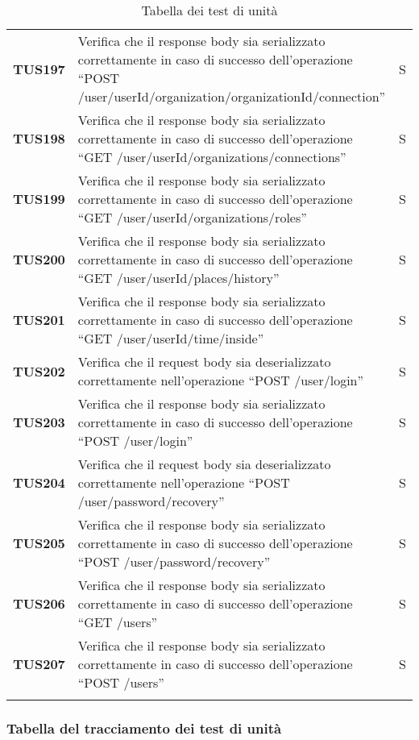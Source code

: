 \documentclass[../../piano-di-qualifica.tex]{subfiles}
\begin{document}
\begin{longtable}[H]{>{\centering\bfseries}m{3cm} >{}m{10cm} >{\centering\arraybackslash}m{3cm}}
  TUS197 & Verifica che il response body sia serializzato correttamente in caso di successo dell'operazione ``POST /user/{userId}/organization/{organizationId}/connection'' & S \\
  TUS198 & Verifica che il response body sia serializzato correttamente in caso di successo dell'operazione ``GET /user/{userId}/organizations/connections'' & S \\
  TUS199 & Verifica che il response body sia serializzato correttamente in caso di successo dell'operazione ``GET /user/{userId}/organizations/roles'' & S \\
  TUS200 & Verifica che il response body sia serializzato correttamente in caso di successo dell'operazione ``GET /user/{userId}/places/history'' & S \\
  TUS201 & Verifica che il response body sia serializzato correttamente in caso di successo dell'operazione ``GET /user/{userId}/time/inside'' & S \\
  TUS202 & Verifica che il request body sia deserializzato correttamente nell'operazione ``POST /user/login'' & S \\
  TUS203 & Verifica che il response body sia serializzato correttamente in caso di successo dell'operazione ``POST /user/login'' & S \\
  TUS204 & Verifica che il request body sia deserializzato correttamente nell'operazione ``POST /user/password/recovery'' & S \\
  TUS205 & Verifica che il response body sia serializzato correttamente in caso di successo dell'operazione ``POST /user/password/recovery'' & S \\
  TUS206 & Verifica che il response body sia serializzato correttamente in caso di successo dell'operazione ``GET /users'' & S \\
  TUS207 & Verifica che il response body sia serializzato correttamente in caso di successo dell'operazione ``POST /users'' & S \\
  \rowcolor{white}
  \caption{Tabella dei test di unità}%
  \label{tab:test_di_unita}
\end{longtable}


\subsubsection{Tabella del tracciamento dei test di unità}%
\label{subsub:tabella_tracciamento_test_di_unita}
\end{document}
